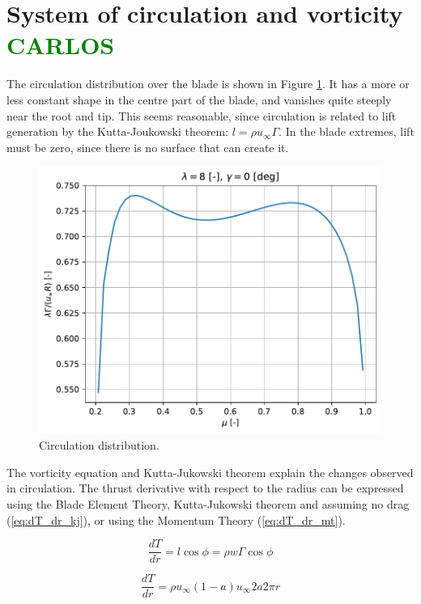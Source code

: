 \section{System of circulation and vorticity \textcolor{green}{CARLOS}}

The circulation distribution over the blade is shown in Figure \ref{img:gamma_}. It has a more or less constant shape in the centre part of the blade, and vanishes quite steeply near the root and tip. This seems reasonable, since circulation is related to lift generation by the Kutta-Joukowski theorem: $ l = \rho u_{\infty} \Gamma $. In the blade extremes, lift must be zero, since there is no surface that can create it.

\begin{figure}[htbp]
	\centering
	\includegraphics[height=0.45\textheight]{./img/circulation/gamma_.pdf}
	\caption{Circulation distribution.}
	\label{img:gamma_}
\end{figure}

The vorticity equation and Kutta-Jukowski theorem explain the changes observed in circulation. The thrust derivative with respect to the radius can be expressed using the Blade Element Theory, Kutta-Jukowski theorem and assuming no drag (\ref{eq:dT_dr_kj}), or using the Momentum Theory (\ref{eq:dT_dr_mt}).

\begin{equation}
	\frac{dT}{dr} = l \cos \phi = \rho w \Gamma \cos \phi
	\label{eq:dT_dr_kj}
\end{equation}

\begin{equation}
	\frac{dT}{dr} = \rho u_{\infty} (1-a) u_{\infty} 2a 2\pi r
	\label{eq:dT_dr_mt}
\end{equation}

